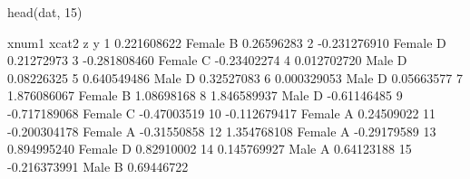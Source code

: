 \begin{Schunk}
\begin{Sinput}
 head(dat, 15)
\end{Sinput}
\begin{Soutput}
          xnum1  xcat2 z           y
1   0.221608622 Female B  0.26596283
2  -0.231276910 Female D  0.21272973
3  -0.281808460 Female C -0.23402274
4   0.012702720   Male D  0.08226325
5   0.640549486   Male D  0.32527083
6   0.000329053   Male D  0.05663577
7   1.876086067 Female B  1.08698168
8   1.846589937   Male D -0.61146485
9  -0.717189068 Female C -0.47003519
10 -0.112679417 Female A  0.24509022
11 -0.200304178 Female A -0.31550858
12  1.354768108 Female A -0.29179589
13  0.894995240 Female D  0.82910002
14  0.145769927   Male A  0.64123188
15 -0.216373991   Male B  0.69446722
\end{Soutput}
\end{Schunk}
